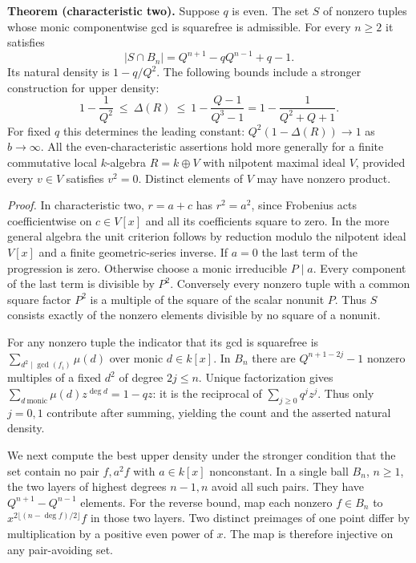 \medskip\noindent\textbf{Theorem (characteristic two).}
Suppose $q$ is even. The set $S$ of nonzero tuples whose monic componentwise
gcd is squarefree is admissible. For every $n\ge2$ it satisfies
\[
 |S\cap B_n|=Q^{n+1}-qQ^{n-1}+q-1.
\]
Its natural density is $1-q/Q^2$. The following bounds include a stronger
construction for upper density:
\begin{equation}
 1-\frac{1}{Q^2}\ \le\ \Delta(R)
 \ \le\ 1-\frac{Q-1}{Q^3-1}
 =1-\frac1{Q^2+Q+1}.
 \label{eq:local-ring-densities}
\end{equation}
For fixed $q$ this determines the leading constant:
$Q^2(1-\Delta(R))\to1$ as $b\to\infty$. All the even-characteristic
assertions hold more generally for a finite commutative local $k$-algebra
$R=k\oplus V$ with nilpotent maximal ideal $V$, provided every $v\in V$
satisfies $v^2=0$. Distinct elements of $V$ may have nonzero product.

\smallskip\noindent\emph{Proof.}
In characteristic two, $r=a+c$ has $r^2=a^2$, since Frobenius
acts coefficientwise on $c\in V[x]$ and all its coefficients square to zero.
In the more general algebra the unit criterion follows by reduction
modulo the nilpotent ideal $V[x]$ and a finite geometric-series inverse. If $a=0$ the last term
of the progression is zero. Otherwise choose a monic irreducible
$P\mid a$. Every component of the last term is divisible by $P^2$.
Conversely every nonzero tuple with a common square factor $P^2$ is a
multiple of the square of the scalar nonunit $P$. Thus $S$ consists
exactly of the nonzero elements divisible by no square of a nonunit.

For any nonzero tuple the indicator that its gcd is squarefree is
$\sum_{d^2\mid\gcd(f_i)}\mu(d)$ over monic $d\in k[x]$. In $B_n$
there are $Q^{n+1-2j}-1$ nonzero multiples of a fixed $d^2$ of degree
$2j\le n$. Unique factorization gives
$\sum_{d\ \mathrm{monic}}\mu(d)z^{\deg d}=1-qz$: it is the reciprocal
of $\sum_{j\ge0}q^j z^j$. Thus only $j=0,1$ contribute after
summing, yielding the count and the asserted natural density.

We next compute the best upper density under the stronger condition that the set
contain no pair $f,a^2f$ with $a\in k[x]$ nonconstant. In a single
ball $B_n$, $n\ge1$, the two layers of highest degrees $n-1,n$ avoid
all such pairs. They have $Q^{n+1}-Q^{n-1}$ elements. For the reverse
bound, map each nonzero $f\in B_n$ to
$x^{2\lfloor(n-\deg f)/2\rfloor}f$ in those two layers. Two distinct
preimages of one point differ by multiplication by a positive even
power of $x$. The map is therefore injective on any pair-avoiding set.

